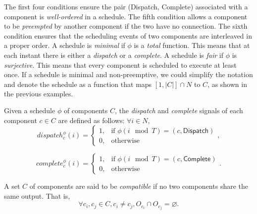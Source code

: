 The first four conditions ensure the pair (\textsf{Dispatch}, \textsf{Complete}) associated with a component is \emph{well-ordered} in a schedule. 
The fifth condition allows a component to be \emph{preempted} by another component if the two have no connection. The sixth condition ensures that the scheduling events of two components are interleaved in a proper order.
A schedule is \emph{minimal} if $\phi$ is a \emph{total} function. This means that at each instant there is either a \emph{dispatch} or a \emph{complete}. 
A schedule is \emph{fair} if $\phi$ is \emph{surjective}. This means that every component is scheduled to execute at least once.
If a schedule is minimal and non-preemptive, we could simplify the notation and denote the schedule as a function that maps $[1, |C|] \cap N$ to $C$, as shown in the previous examples.

Given a schedule $\phi$ of components $C$, the \emph{dispatch} and \emph{complete} signals of each component $c \in C$ are defined as follows: $\forall i \in N$,
\begin{equation}
\label{eqn:dispatch}
    dispatch_c^\phi(i) =
    \begin{cases}
      1, & \text{if } \phi(i \mod T) = (c, \textsf{Dispatch}) \\
      0, & \text{otherwise}
    \end{cases},
\end{equation}

\begin{equation}
\label{eqn:complete}
    complete_c^\phi(i) =
    \begin{cases}
      1, & \text{if } \phi(i \mod T) = (c, \textsf{Complete}) \\
      0, & \text{otherwise}
    \end{cases}.
\end{equation}

\bigskip
{}
A set $C$ of components are said to be \emph{compatible} if no two components share the same output. That is,
\begin{equation}
	\forall c_i,c_j \in C, c_i\neq c_j, O_{c_i} \cap O_{c_j} = \varnothing.
\end{equation}

